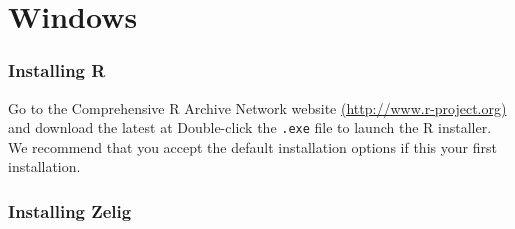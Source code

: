 \section{Windows}\label{ss:win}

\subsubsection{Installing R}

Go to the Comprehensive R Archive Network website
\url{(http://www.r-project.org)} and download the latest
 at
Double-click the {\tt .exe} file to launch the R installer.  We recommend
that you accept the default installation options if this your first
installation.

\subsubsection{Installing Zelig}

